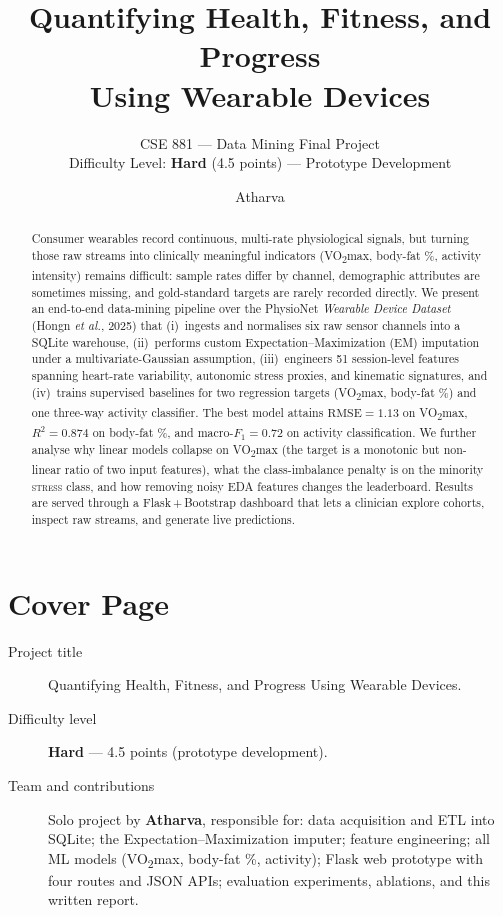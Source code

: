 \documentclass[sigconf,nonacm]{acmart}
\title{Quantifying Health, Fitness, and Progress\\Using Wearable Devices}
\subtitle{CSE 881 --- Data Mining Final Project \\ Difficulty Level: \textbf{Hard} (4.5 points) --- Prototype Development}
\author{Atharva}
\affiliation{%
  \institution{Department of Computer Science and Engineering}
  \institution{Michigan State University}
  \city{East Lansing}\state{MI}\country{USA}
}
\begin{document}
\begin{abstract}
Consumer wearables record continuous, multi-rate physiological signals,
but turning those raw streams into clinically meaningful indicators
(VO\textsubscript{2}max, body-fat \%, activity intensity) remains
difficult: sample rates differ by channel, demographic attributes are
sometimes missing, and gold-standard targets are rarely recorded
directly. We present an end-to-end data-mining pipeline over the
PhysioNet \emph{Wearable Device Dataset} (Hongn \emph{et al.}, 2025)
that (i)~ingests and normalises six raw sensor channels into a SQLite
warehouse, (ii)~performs custom Expectation--Maximization (EM)
imputation under a multivariate-Gaussian assumption, (iii)~engineers
51 session-level features spanning heart-rate variability, autonomic
stress proxies, and kinematic signatures, and
(iv)~trains supervised baselines for two regression targets
(VO\textsubscript{2}max, body-fat \%) and one three-way activity
classifier. The best model attains
$\mathrm{RMSE}=1.13$ on VO\textsubscript{2}max, $R^{2}=0.874$ on
body-fat \%, and macro-$F_{1}=0.72$ on activity classification. We
further analyse why linear models collapse on VO\textsubscript{2}max
(the target is a monotonic but non-linear ratio of two input
features), what the class-imbalance penalty is on the minority
\textsc{stress} class, and how removing noisy EDA features changes
the leaderboard. Results are served through a Flask\,+\,Bootstrap
dashboard that lets a clinician explore cohorts, inspect raw streams,
and generate live predictions.
\end{abstract}


\maketitle

\section*{Cover Page}
\begin{description}
\item[Project title] Quantifying Health, Fitness, and Progress Using
  Wearable Devices.
\item[Difficulty level] \textbf{Hard} --- 4.5 points (prototype development).
\item[Team and contributions]
  Solo project by \textbf{Atharva}, responsible for:
  data acquisition and ETL into SQLite; the
  Expectation--Maximization imputer; feature engineering;
  all ML models (VO\textsubscript{2}max, body-fat \%, activity);
  Flask web prototype with four routes and JSON APIs;
  evaluation experiments, ablations, and this written report.
\end{description}
\end{document}

